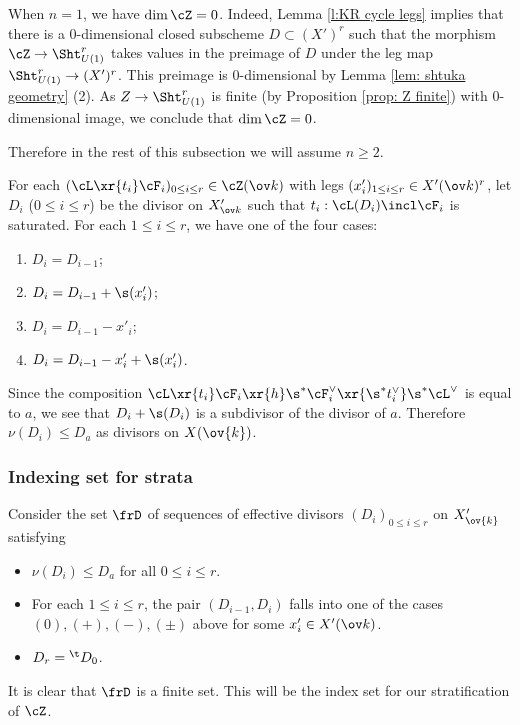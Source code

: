 When $n=1$, we have $\dim \cZ  =0$. Indeed, Lemma \ref{l:KR cycle legs} implies that there is a $0$-dimensional closed subscheme $D \subset (X')^r$ such that the morphism $\cZ \rightarrow \Sht_{U(1)}^r$ takes values in the preimage of $D$ under the leg map $\Sht_{U(1)}^r \rightarrow (X')^r$. This preimage is $0$-dimensional by Lemma \ref{lem: shtuka geometry} (2). As $Z \rightarrow \Sht_{U(1)}^r$ is finite (by Proposition \ref{prop: Z finite}) with 0-dimensional image, we conclude that $\dim \cZ = 0$.

Therefore in the rest of this subsection we will assume $n\ge2$.

For each $(\cL\xr{t_{i}}\cF_{i})_{0\le i\le r}\in \cZ(\ov k)$ with legs $(x'_{i})_{1\le i\le r}\in X'(\ov k)^{r}$, let $D_{i}$ ($0\le i\le r$) be the divisor on $X'_{\ov k}$ such that $t_{i}: \cL(D_{i})\incl \cF_{i}$ is saturated. For each $1\le i\le r$, we have one of the  four cases:
\begin{enumerate}
\item[(0)] $D_{i}=D_{i-1}$;
\item[(+)] $D_{i}=D_{i-1}+\s(x'_{i})$;
\item[($-$)] $D_{i}=D_{i-1}-x'_{i}$;
\item[($\pm$)] $D_{i}=D_{i-1}-x'_{i}+\s(x'_{i})$.
\end{enumerate}
Since the composition $\cL\xr{t_{i}}\cF_{i}\xr{h}\s^{*}\cF_{i}^{\vee}\xr{\s^{*}t_{i}^{\vee}}\s^{*}\cL^{\vee}$ is equal to $a$, we see that $D_{i}+\s(D_{i})$ is a subdivisor of the divisor of $a$. Therefore $\nu(D_{i})\le D_{a}$ as divisors on $X(\ov{k})$.

\subsubsection{Indexing set for strata} Consider the set $\frD$ of sequences of effective divisors $(D_{i})_{0\le i\le r}$ on $X'_{\ov{k}}$ satisfying
\begin{itemize}
\item $\nu(D_{i})\le D_{a}$ for all $0\le i\le r$.
\item For each $1\le i\le r$, the pair $(D_{i-1}, D_{i})$ falls into one of the cases $(0),(+),(-),(\pm)$ above for some $x'_{i}\in X'(\ov k)$.
\item $D_{r}={}^{\t}D_{0}$.
\end{itemize}
It is clear that $\frD$ is a finite set. This will be the index set for our stratification of $\cZ$.

